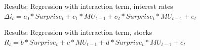 \documentclass{beamer}
\begin{document}
\begin{frame}{Results: Regression with interaction term, interest rates}{$\Delta i_t = c_0*Surprise_t + c_1*MU_{t-1} + c_2*Surprise_t*MU_{t-1} + e_t$}
\vspace{-0.1cm}
\centering
\end{frame}



\begin{frame}{Results: Regression with interaction term, stocks}
{$R_t = b*Surprise_t + c*MU_{t-1} + d*Surprise_t*MU_{t-1} + e_t$}
\vspace{-0.3cm}
\centering
\vspace{0.2cm}
\small
\end{frame}
\end{document}
